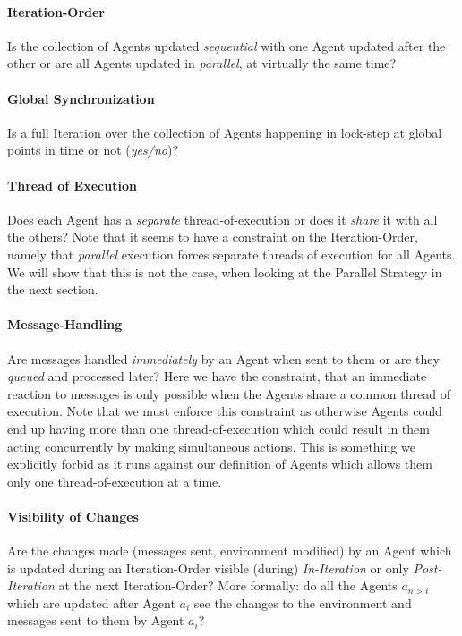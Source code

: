 \paragraph{Iteration-Order}
Is the collection of Agents updated \textit{sequential} with one Agent updated after the other or are all Agents updated in \textit{parallel}, at virtually the same time?

\paragraph{Global Synchronization}
Is a full Iteration over the collection of Agents happening in lock-step at global points in time or not (\textit{yes/no})?

\paragraph{Thread of Execution}
Does each Agent has a \textit{separate} thread-of-execution or does it \textit{share} it with all the others? Note that it seems to have a constraint on the Iteration-Order, namely that \textit{parallel} execution forces separate threads of execution for all Agents. We will show that this is not the case, when looking at the Parallel Strategy in the next section.

\paragraph{Message-Handling}
Are messages handled \textit{immediately} by an Agent when sent to them or are they \textit{queued} and processed later? Here we have the constraint, that an immediate reaction to messages is only possible when the Agents share a common thread of execution. Note that we must enforce this constraint as otherwise Agents could end up having more than one thread-of-execution which could result in them acting concurrently by making simultaneous actions. This is something we explicitly forbid as it runs against our definition of Agents which allows them only one thread-of-execution at a time.

\paragraph{Visibility of Changes}
Are the changes made (messages sent, environment modified) by an Agent which is updated during an Iteration-Order visible (during) \textit{In-Iteration} or only \textit{Post-Iteration} at the next Iteration-Order? More formally: do all the Agents $a_{n>i}$ which are updated after Agent $a_i$ see the changes to the environment and messages sent to them by Agent $a_i$?

